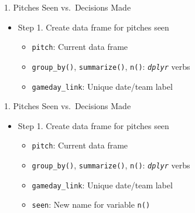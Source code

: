 \begin{frame}[fragile]{1. Pitches Seen vs.~Decisions Made}

\begin{itemize}
\tightlist
\item
  Step 1. Create data frame for pitches seen

  \begin{itemize}
  \tightlist
  \item
    \texttt{pitch}: Current data frame
  \item
    \texttt{group\_by()}, \texttt{summarize()}, \texttt{n()}:
    \emph{\texttt{dplyr}} verbs
  \item
    \texttt{gameday\_link}: Unique date/team label
  \end{itemize}
\end{itemize}

\footnotesize

\begin{Shaded}
\end{Shaded}

\end{frame}

\begin{frame}[fragile]{1. Pitches Seen vs.~Decisions Made}

\begin{itemize}
\tightlist
\item
  Step 1. Create data frame for pitches seen

  \begin{itemize}
  \tightlist
  \item
    \texttt{pitch}: Current data frame
  \item
    \texttt{group\_by()}, \texttt{summarize()}, \texttt{n()}:
    \emph{\texttt{dplyr}} verbs
  \item
    \texttt{gameday\_link}: Unique date/team label
  \item
    \texttt{seen}: New name for variable \texttt{n()}
  \end{itemize}
\end{itemize}

\footnotesize

\begin{Shaded}
\end{Shaded}

\end{frame}

